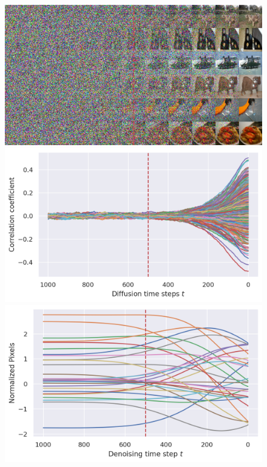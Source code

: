 \begin{figure}[ht!]
    \includegraphics[width=\linewidth]{figs/imgs/imagenet64_progressive_generation.png}
\endminipage\hfill
{}
  \includegraphics[width=\linewidth]{figs/plots/imagenet64_correlation_trajectories.png}
\endminipage\hfill
{}
  \includegraphics[width=\linewidth]{figs/plots/imagenet64_normalized_trajectories_flipped.png}
\endminipage\hfill



\end{figure}
